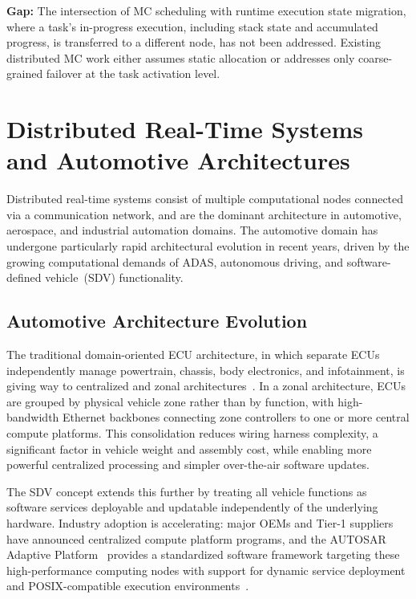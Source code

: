 \textbf{Gap:} The intersection of MC scheduling with runtime execution state
migration, where a task's in-progress execution, including stack state and
accumulated progress, is transferred to a different node, has not been addressed.
Existing distributed MC work either assumes static allocation or addresses only
coarse-grained failover at the task activation level.

\section{Distributed Real-Time Systems and Automotive Architectures}
\label{sec:rw_distributed}

Distributed real-time systems consist of multiple computational nodes connected via
a communication network, and are the dominant architecture in automotive, aerospace,
and industrial automation domains. The automotive domain has undergone particularly
rapid architectural evolution in recent years, driven by the growing computational
demands of ADAS, autonomous driving, and software-defined vehicle~(SDV) functionality.

\subsection{Automotive Architecture Evolution}
\label{subsec:rw_automotive}

The traditional domain-oriented ECU architecture, in which separate ECUs independently
manage powertrain, chassis, body electronics, and infotainment, is giving way to
centralized and zonal architectures~\cite{autosar_ap2023,Ayres2024,wang2024ee}. %
In a zonal
architecture, ECUs are grouped by physical vehicle zone rather than by function,
with high-bandwidth Ethernet backbones connecting zone controllers to one or more
central compute platforms. This consolidation reduces wiring harness complexity, a
significant factor in vehicle weight and assembly cost, while enabling more powerful
centralized processing and simpler over-the-air software updates.

The SDV concept extends this further by treating all vehicle functions as software
services deployable and updatable independently of the underlying hardware. Industry
adoption is accelerating: major OEMs and Tier-1 suppliers have announced centralized
compute platform programs, and the AUTOSAR Adaptive Platform~\cite{autosar2023}
provides a standardized software framework targeting these high-performance computing
nodes with support for dynamic service deployment and POSIX-compatible execution
environments~\cite{pan2024sdv}.

